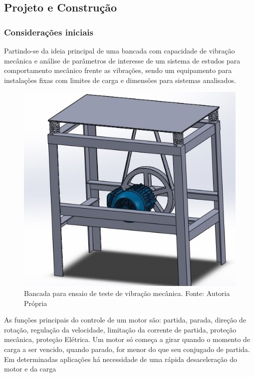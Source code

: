 \subsection{Projeto e Construção}

\subsubsection*{Considerações iniciais}

Partindo-se da ideia principal de uma bancada com capacidade de vibração mecânica e análise de parâmetros de interesse de um sistema de estudos para comportamento mecânico frente as vibrações, sendo um equipamento para instalações fixas com limites de carga e dimensões para sistemas analisados.

\begin{figure}[H]
    \centering
        \includegraphics[keepaspectratio=true,scale=0.6]{figuras/1.png}
    \caption{Bancada para ensaio de teste de vibração mecânica. Fonte: Autoria Própria}
    \label{bancada}
\end{figure}

As funções principais do controle de um motor são: partida, parada, direção de rotação, regulação da velocidade, limitação da corrente de partida, proteção mecânica, proteção Elétrica. Um motor só começa a girar quando o momento de carga a ser vencido, quando parado, for menor do que seu conjugado de partida. Em determinadas aplicações há necessidade de uma rápida desaceleração do motor e da carga

